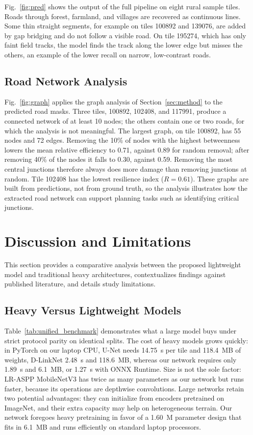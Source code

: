 \documentclass{ieeeaccess}
\begin{document}
Fig.~\ref{fig:pred} shows the output of the full pipeline on eight rural sample tiles. Roads through forest, farmland, and villages are recovered as continuous lines. Some thin straight segments, for example on tiles 100892 and 139076, are added by gap bridging and do not follow a visible road. On tile 195274, which has only faint field tracks, the model finds the track along the lower edge but misses the others, an example of the lower recall on narrow, low-contrast roads.

\subsection{Road Network Analysis}

Fig.~\ref{fig:graph} applies the graph analysis of Section~\ref{sec:method} to the predicted road masks. Three tiles, 100892, 102408, and 117991, produce a connected network of at least 10 nodes; the others contain one or two roads, for which the analysis is not meaningful. The largest graph, on tile 100892, has 55 nodes and 72 edges. Removing the 10\% of nodes with the highest betweenness lowers the mean relative efficiency to 0.71, against 0.89 for random removal; after removing 40\% of the nodes it falls to 0.30, against 0.59. Removing the most central junctions therefore always does more damage than removing junctions at random. Tile 102408 has the lowest resilience index ($R = 0.61$). These graphs are built from predictions, not from ground truth, so the analysis illustrates how the extracted road network can support planning tasks such as identifying critical junctions.


\section{Discussion and Limitations}
\label{sec:discussion}

This section provides a comparative analysis between the proposed lightweight model and traditional heavy architectures, contextualizes findings against published literature, and details study limitations.

\subsection{Heavy Versus Lightweight Models}

Table~\ref{tab:unified_benchmark} demonstrates what a large model buys under strict protocol parity on identical splits. The cost of heavy models grows quickly: in PyTorch on our laptop CPU, U-Net needs 14.75~s per tile and 118.4~MB of weights, D-LinkNet 2.48~s and 118.6~MB, whereas our network requires only 1.89~s and 6.1~MB, or 1.27~s with ONNX Runtime. Size is not the sole factor: LR-ASPP MobileNetV3 has twice as many parameters as our network but runs faster, because its operations are depthwise convolutions. Large networks retain two potential advantages: they can initialize from encoders pretrained on ImageNet, and their extra capacity may help on heterogeneous terrain. Our network foregoes heavy pretraining in favor of a 1.60~M parameter design that fits in 6.1~MB and runs efficiently on standard laptop processors.
\end{document}
